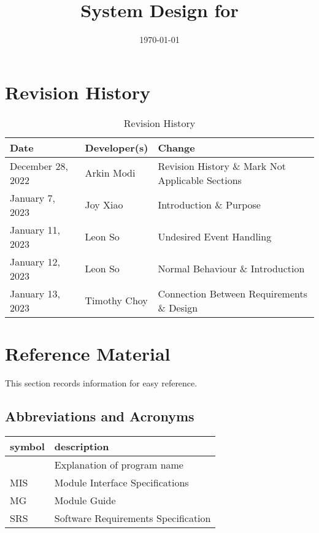 \documentclass[12pt, titlepage]{article}
\begin{document}
\title{System Design for \progname{}}
\author{\authname}
\date{\today}

\maketitle


\section{Revision History}

\begin{table}[hp]
	\caption{Revision History} \label{TblRevisionHistory}
	\begin{tabularx}{\textwidth}{llX}
		\toprule
		\textbf{Date}     & \textbf{Developer(s)} & \textbf{Change}                                  \\
		\midrule
		December 28, 2022 & Arkin Modi            & Revision History \& Mark Not Applicable Sections \\
		January 7, 2023   & Joy Xiao              & Introduction \& Purpose                          \\
		January 11, 2023  & Leon So               & Undesired Event Handling                         \\
		January 12, 2023  & Leon So               & Normal Behaviour \& Introduction                 \\
		January 13, 2023  & Timothy Choy          & Connection Between Requirements \& Design        \\
		\bottomrule
	\end{tabularx}
\end{table}

\newpage

\section{Reference Material}

This section records information for easy reference.

\subsection{Abbreviations and Acronyms}

\begin{tabular}{l l}
	\toprule
	\textbf{symbol} & \textbf{description}                \\
	\midrule
	\progname       & Explanation of program name         \\
	MIS             & Module Interface Specifications     \\
	MG              & Module Guide                        \\
	SRS             & Software Requirements Specification \\
	\bottomrule
\end{tabular}
\end{document}
